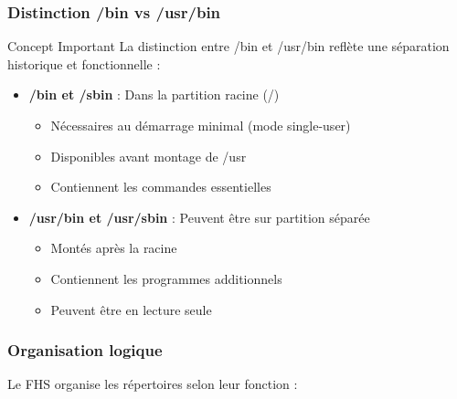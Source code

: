 \documentclass[12pt,a4paper]{article}
\begin{document}
\subsubsection{Distinction /bin vs /usr/bin}

\begin{infobox}{Concept Important}
La distinction entre /bin et /usr/bin reflète une séparation historique et fonctionnelle :
\end{infobox}

\begin{itemize}
    \item \textbf{/bin et /sbin} : Dans la partition racine (/)
    \begin{itemize}
        \item Nécessaires au démarrage minimal (mode single-user)
        \item Disponibles avant montage de /usr
        \item Contiennent les commandes essentielles
    \end{itemize}
    \item \textbf{/usr/bin et /usr/sbin} : Peuvent être sur partition séparée
    \begin{itemize}
        \item Montés après la racine
        \item Contiennent les programmes additionnels
        \item Peuvent être en lecture seule
    \end{itemize}
\end{itemize}

\subsubsection{Organisation logique}

Le FHS organise les répertoires selon leur fonction :
\end{document}

